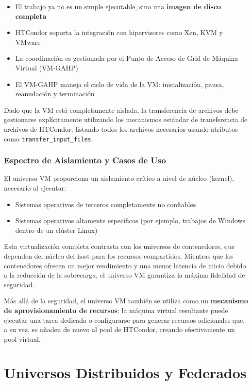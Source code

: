 \begin{itemize}
	\item El trabajo ya no es un simple ejecutable, sino una \textbf{imagen de disco completa}
	\item HTCondor soporta la integración con hipervisores como Xen, KVM y VMware \citep{HTCondor_vm_universe_wiki}
	\item La coordinación es gestionada por el Punto de Acceso de Grid de Máquina Virtual (VM-GAHP)
	\item El VM-GAHP maneja el ciclo de vida de la VM: inicialización, pausa, reanudación y terminación
\end{itemize}

Dado que la VM está completamente aislada, la transferencia de archivos debe gestionarse explícitamente utilizando los mecanismos estándar de transferencia de archivos de HTCondor, listando todos los archivos necesarios usando atributos como \texttt{transfer\_input\_files}.

\subsubsection{Espectro de Aislamiento y Casos de Uso}

El universo VM proporciona un aislamiento crítico a nivel de núcleo (kernel), necesario al ejecutar:

\begin{itemize}
	\item Sistemas operativos de terceros completamente no confiables
	\item Sistemas operativos altamente específicos (por ejemplo, trabajos de Windows dentro de un clúster Linux)
\end{itemize}

Esta virtualización completa contrasta con los universos de contenedores, que dependen del núcleo del host para los recursos compartidos. Mientras que los contenedores ofrecen un mejor rendimiento y una menor latencia de inicio debido a la reducción de la sobrecarga, el universo VM garantiza la máxima fidelidad de seguridad.

Más allá de la seguridad, el universo VM también se utiliza como un \textbf{mecanismo de aprovisionamiento de recursos}: la máquina virtual resultante puede ejecutar una tarea dedicada o configurarse para generar recursos adicionales que, a su vez, se añaden de nuevo al pool de HTCondor, creando efectivamente un pool virtual.

\section{Universos Distribuidos y Federados}

